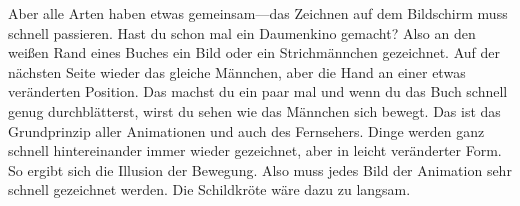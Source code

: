 Aber alle Arten haben etwas gemeinsam---das Zeichnen auf dem Bildschirm muss schnell passieren. Hast du schon mal ein Daumenkino gemacht? Also an den weißen Rand eines Buches ein Bild oder ein Strichmännchen gezeichnet. Auf der nächsten Seite wieder das gleiche Männchen, aber die Hand an einer etwas veränderten Position. Das machst du ein paar mal und wenn du das Buch schnell genug durchblätterst, wirst du sehen wie das Männchen sich bewegt. Das ist das Grundprinzip aller Animationen und auch des Fernsehers. Dinge werden ganz schnell hintereinander immer wieder gezeichnet, aber in leicht veränderter Form. So ergibt sich die Illusion der Bewegung. Also muss jedes Bild der Animation sehr schnell gezeichnet werden. Die Schildkröte wäre dazu zu langsam.
\par


